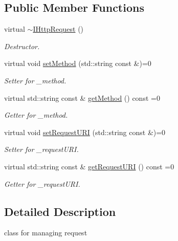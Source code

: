 \subsection*{Public Member Functions}
\begin{DoxyCompactItemize}
\item 
\hypertarget{classapimeal_1_1IHttpRequest_a75d1d8b94d7a06e2cd06f9f381e1ffe8}{virtual \hyperlink{classapimeal_1_1IHttpRequest_a75d1d8b94d7a06e2cd06f9f381e1ffe8}{$\sim$\-I\-Http\-Request} ()}\label{classapimeal_1_1IHttpRequest_a75d1d8b94d7a06e2cd06f9f381e1ffe8}

\begin{DoxyCompactList}\small\item\em Destructor. \end{DoxyCompactList}\item 
virtual void \hyperlink{classapimeal_1_1IHttpRequest_a19de02fe350e31b7b21b2b9e16054f26}{set\-Method} (std\-::string const \&)=0
\begin{DoxyCompactList}\small\item\em Setter for \-\_\-method. \end{DoxyCompactList}\item 
virtual std\-::string const \& \hyperlink{classapimeal_1_1IHttpRequest_a397ada95584df34288f026a368c94630}{get\-Method} () const =0
\begin{DoxyCompactList}\small\item\em Getter for \-\_\-method. \end{DoxyCompactList}\item 
virtual void \hyperlink{classapimeal_1_1IHttpRequest_a00c82fbfd32e54cf4ea0db7ea3200662}{set\-Request\-U\-R\-I} (std\-::string const \&)=0
\begin{DoxyCompactList}\small\item\em Setter for \-\_\-request\-U\-R\-I. \end{DoxyCompactList}\item 
virtual std\-::string const \& \hyperlink{classapimeal_1_1IHttpRequest_adade2c139e4701f2777dd8304c88aa4c}{get\-Request\-U\-R\-I} () const =0
\begin{DoxyCompactList}\small\item\em Getter for \-\_\-request\-U\-R\-I. \end{DoxyCompactList}\end{DoxyCompactItemize}


\subsection{Detailed Description}
class for managing request 

